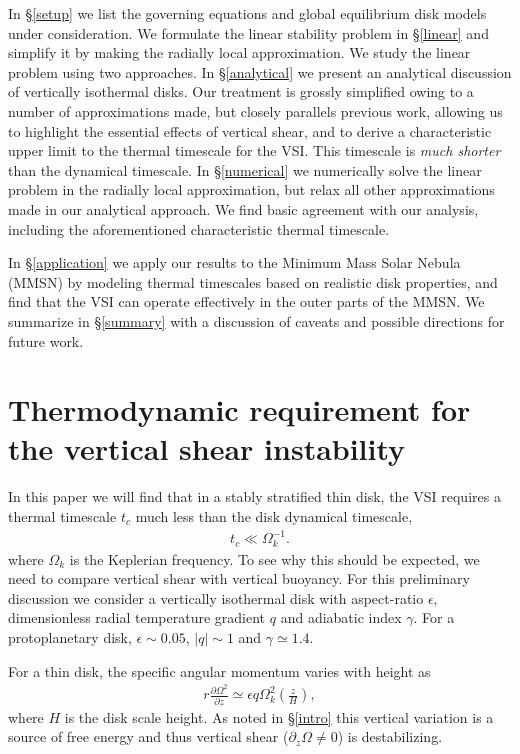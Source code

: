 \documentclass[iop]{emulateapj}
\newcommand{\p}{\partial}
\begin{document}
In \S\ref{setup} we list the governing equations and global
equilibrium disk models under   
consideration. We formulate the linear stability problem in 
\S\ref{linear} and simplify it by making the radially local
approximation. We study the linear problem using two approaches. In
\S\ref{analytical} we present an analytical discussion of vertically
isothermal disks. Our treatment is grossly simplified owing to a
number of approximations made, but closely parallels previous work, 
allowing us to highlight the essential effects of vertical shear, and to
derive a characteristic upper limit to the thermal timescale for the
VSI. This timescale is \emph{much shorter} than the dynamical
timescale. In \S\ref{numerical} we numerically
solve the linear problem in the radially local approximation, but
relax all other approximations made in our analytical approach.    
We find basic agreement with our analysis, including
the aforementioned characteristic thermal timescale. 

In
\S\ref{application} we apply our results to the Minimum Mass
Solar Nebula (MMSN) by modeling thermal 
timescales based on realistic disk properties, and find that the VSI
can operate effectively in the outer parts of the MMSN. We summarize in
\S\ref{summary} with a discussion of caveats and possible directions
for future work.  



\section{Thermodynamic requirement for the vertical shear instability}\label{vsi_require}     In this paper we will find that in a stably stratified thin disk, the VSI  
requires a thermal timescale $t_c$ much less than the
disk dynamical timescale, 
\begin{align}
  t _c \ll \Omega_k^{-1}. 
\end{align}
where $\Omega_k$ is the Keplerian frequency. 
To see why this should be expected, we need to compare vertical shear
with vertical buoyancy. For this preliminary discussion we consider a
vertically isothermal disk with aspect-ratio $\epsilon$,  
dimensionless radial temperature gradient $q$ and adiabatic index
$\gamma$. For a protoplanetary disk, $\epsilon \sim 0.05$, $|q|\sim 1$ and $\gamma\simeq 1.4$. 

For a thin disk, the specific angular momentum varies with height as 
\begin{align}\label{vshear_thin}
  r \frac{\p \Omega^2 }{\p z} \simeq \epsilon q \Omega_k^2\left(\frac{z}{H}\right),
\end{align}
where $H$ is the disk scale height. As noted in
\S\ref{intro} this vertical variation is a source of free energy and
thus vertical shear ($\p_z\Omega \neq0$) is destabilizing. 
\end{document}
